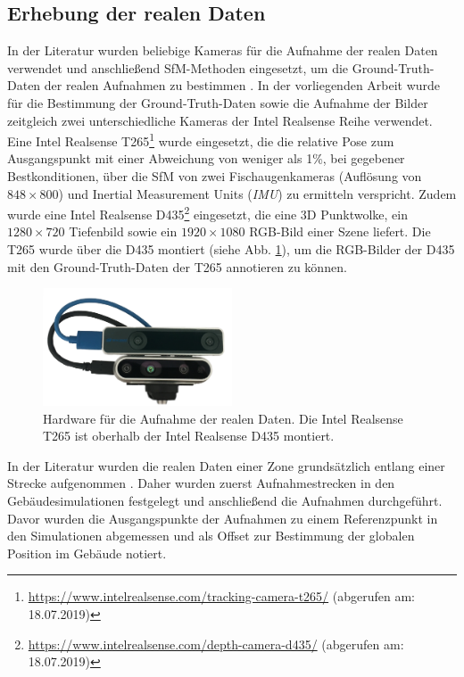 \subsection{Erhebung der realen Daten}
\label{subsec:record_real_data}
In der Literatur wurden beliebige Kameras für die Aufnahme der realen Daten verwendet und anschließend SfM-Methoden eingesetzt, um die Ground-Truth-Daten der realen Aufnahmen zu bestimmen \cite{kendallPoseNetConvolutionalNetwork2015, clarkVidLocDeepSpatioTemporal2017, acharyaBIMPoseNetIndoorCamera2019}. 
In der vorliegenden Arbeit wurde für die Bestimmung der Ground-Truth-Daten sowie die Aufnahme der Bilder zeitgleich zwei unterschiedliche Kameras der Intel Realsense Reihe verwendet. Eine Intel Realsense T265\footnote{\url{https://www.intelrealsense.com/tracking-camera-t265/} (abgerufen am: 18.07.2019)} wurde eingesetzt, die die relative Pose zum Ausgangspunkt mit einer Abweichung von weniger als 1\%, bei gegebener Bestkonditionen, über die SfM von zwei Fischaugenkameras (Auflösung von $848 \times 800$) und Inertial Measurement Units (\textit{IMU}) zu ermitteln verspricht. Zudem wurde eine Intel Realsense D435\footnote{ \url{https://www.intelrealsense.com/depth-camera-d435/} (abgerufen am: 18.07.2019)} eingesetzt, die eine 3D Punktwolke, ein $1280\times720$ Tiefenbild sowie ein $1920\times1080$ RGB-Bild einer Szene liefert. Die T265 wurde über die D435 montiert (siehe Abb. \ref{fig:t265_d435}), um die RGB-Bilder der D435 mit den Ground-Truth-Daten der T265 annotieren zu können.

\begin{figure}
	\centering
	\includegraphics[width=0.5\textwidth]{images/real_dataset/t265_d435_2.png}
	\caption{Hardware für die Aufnahme der realen Daten. Die Intel Realsense T265 ist oberhalb der Intel Realsense D435 montiert.}
	\label{fig:t265_d435}
\end{figure}

In der Literatur wurden die realen Daten einer Zone grundsätzlich entlang einer Strecke aufgenommen \cite{kendallPoseNetConvolutionalNetwork2015, clarkVidLocDeepSpatioTemporal2017, acharyaBIMPoseNetIndoorCamera2019}. Daher wurden zuerst Aufnahmestrecken in den Gebäudesimulationen festgelegt und anschließend die Aufnahmen durchgeführt. Davor wurden die Ausgangspunkte der Aufnahmen zu einem Referenzpunkt in den Simulationen abgemessen und als Offset zur Bestimmung der globalen Position im Gebäude notiert.


